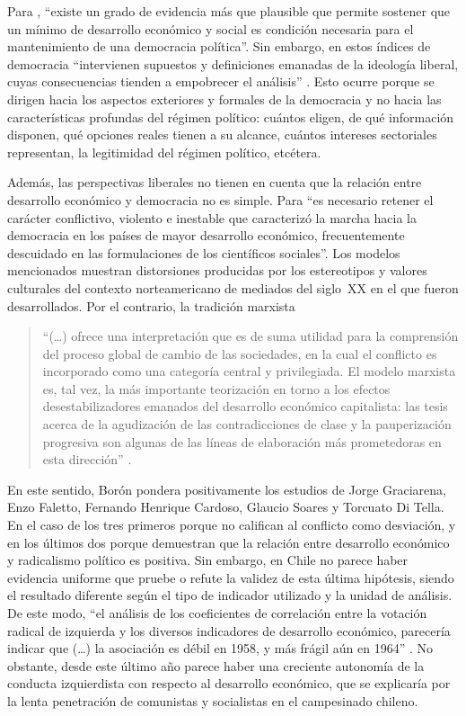 {Para \textcite[247]{1572-BORON1970}, \enquote{existe un grado de evidencia más que plausible que permite sostener que un mínimo de desarrollo económico y social es condición necesaria  para el mantenimiento de una democracia política}. Sin embargo, en estos índices de democracia \enquote{intervienen supuestos y definiciones emanadas de la ideología liberal, cuyas consecuencias tienden a empobrecer el análisis} \parencite[250]{1572-BORON1970}. Esto ocurre porque se dirigen hacia los aspectos exteriores y formales de la democracia y no hacia las características profundas del régimen político: cuántos eligen, de qué información disponen, qué opciones reales tienen a su alcance, cuántos intereses sectoriales representan, la legitimidad del régimen político, etcétera.

Además, las perspectivas liberales no tienen en cuenta que la relación entre desarrollo económico y democracia no es simple. Para \textcite[252]{1572-BORON1970} \enquote{es necesario retener el carácter conflictivo, violento e inestable que caracterizó la marcha hacia la democracia en los países de mayor desarrollo económico, frecuentemente descuidado en las formulaciones de los científicos sociales}. Los modelos mencionados muestran distorsiones producidas por los estereotipos y valores culturales del contexto norteamericano de mediados del siglo~XX en el que fueron desarrollados. Por el contrario, la tradición marxista

\begin{quote}
\enquote{(\dots) ofrece una interpretación que es de suma utilidad para la comprensión del proceso global de cambio de las sociedades, en la cual el conflicto es incorporado como una categoría central y privilegiada. El modelo marxista es, tal vez, la más importante teorización en torno a los efectos desestabilizadores emanados del desarrollo económico capitalista: las tesis acerca de la agudización de las contradicciones de clase y la pauperización progresiva son algunas de las líneas de elaboración más prometedoras en esta dirección} \parencite[254]{1572-BORON1970}.
\end{quote}

En este sentido, Borón pondera positivamente los estudios de Jorge Graciarena, Enzo Faletto, Fernando Henrique Cardoso, Glaucio Soares y Torcuato Di Tella. En el caso de los tres primeros porque no califican al conflicto como desviación, y en los últimos dos porque demuestran que la relación entre desarrollo económico y radicalismo político es positiva. Sin embargo, en Chile no parece haber evidencia uniforme que pruebe o refute la validez de esta última hipótesis, siendo el resultado diferente según el tipo de indicador utilizado y la unidad de análisis. De este modo, \enquote{el análisis de los coeficientes de correlación entre la votación radical de izquierda y los diversos indicadores de desarrollo económico, parecería indicar que (\dots) la asociación es débil en 1958, y más frágil aún en 1964} \parencite[283]{1572-BORON1970}. No obstante, desde este último año parece haber una creciente autonomía de la conducta izquierdista con respecto al desarrollo económico, que se explicaría por la lenta penetración de comunistas y socialistas en el campesinado chileno.

}
